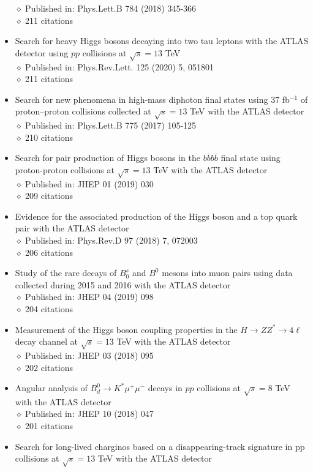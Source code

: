 \documentclass[margin, 10pt]{res} %
\begin{document}
\begin{resume}
\begin{itemize}
$\diamond$ Published in: Phys.Lett.B 784 (2018) 345-366\\
$\diamond$ 211 citations
\item Search for heavy Higgs bosons decaying into two tau leptons with the ATLAS detector using $pp$ collisions at $\sqrt{s} = 13$ TeV\\
$\diamond$ Published in: Phys.Rev.Lett. 125 (2020) 5, 051801\\
$\diamond$ 211 citations
\item Search for new phenomena in high-mass diphoton final states using 37 fb$^{-1}$ of proton--proton collisions collected at $\sqrt{s} = 13$ TeV with the ATLAS detector\\
$\diamond$ Published in: Phys.Lett.B 775 (2017) 105-125\\
$\diamond$ 210 citations
\item Search for pair production of Higgs bosons in the $b\bar{b}b\bar{b}$ final state using proton-proton collisions at $\sqrt{s} = 13$ TeV with the ATLAS detector\\
$\diamond$ Published in: JHEP 01 (2019) 030\\
$\diamond$ 209 citations
\item Evidence for the associated production of the Higgs boson and a top quark pair with the ATLAS detector\\
$\diamond$ Published in: Phys.Rev.D 97 (2018) 7, 072003\\
$\diamond$ 206 citations
\item Study of the rare decays of $B^{s}_{0}$ and $B^{0}$ mesons into muon pairs using data collected during 2015 and 2016 with the ATLAS detector\\
$\diamond$ Published in: JHEP 04 (2019) 098\\
$\diamond$ 204 citations
\item Measurement of the Higgs boson coupling properties in the $H \rightarrow ZZ^{*} \rightarrow 4\ell$ decay channel at $\sqrt{s} = 13$ TeV with the ATLAS detector\\
$\diamond$ Published in: JHEP 03 (2018) 095\\
$\diamond$ 202 citations
\item Angular analysis of $B^{0}_{d} \rightarrow K^{*} \mu^{+}\mu^{-}$ decays in $pp$ collisions at $\sqrt{s} = 8$ TeV with the ATLAS detector\\
$\diamond$ Published in: JHEP 10 (2018) 047\\
$\diamond$ 201 citations
\item Search for long-lived charginos based on a disappearing-track signature in pp collisions at $\sqrt{s} = 13$ TeV with the ATLAS detector\\

\end{itemize}
\end{resume}
\end{document}
